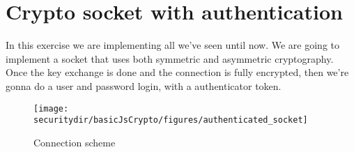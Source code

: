 \section{Crypto socket with authentication}

In this exercise we are implementing all we've seen until now. We are going to implement a socket that uses both symmetric and asymmetric cryptography. Once the key exchange is done and the connection is fully encrypted, then we're gonna do a user and password login, with a authenticator token.

\begin{figure}[htb]
	\begin{centering}
		\texttt{[image: \\securitydir/basicJsCrypto/figures/authenticated\_socket]}
		\par\end{centering}
	\caption{\label{fig:authenticated_socket} Connection scheme}
\end{figure}



